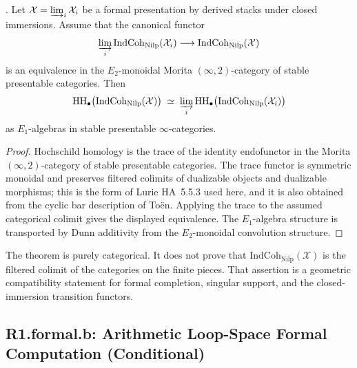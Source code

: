 \begin{theorem}
\label{v4-arith:bzn-sub:thm:R1-formal-a-closes}
\ClaimStatusProvedHere. Let \(\mathcal{X}=\varinjlim_{i}\mathcal{X}_{i}\)
be a formal presentation by derived stacks under closed immersions.
Assume that the canonical functor
\[
\varinjlim_i \mathrm{IndCoh}_{\mathrm{Nilp}}(\mathcal{X}_i)
\longrightarrow
\mathrm{IndCoh}_{\mathrm{Nilp}}(\mathcal{X})
\]
is an equivalence in the \(E_2\)-monoidal Morita
\((\infty,2)\)-category of stable presentable categories. Then
\begin{equation}
\mathrm{HH}_{\bullet}\bigl(\mathrm{IndCoh}_{\mathrm{Nilp}}(\mathcal{X})\bigr)\;\simeq\;\varinjlim_{i}\mathrm{HH}_{\bullet}\bigl(\mathrm{IndCoh}_{\mathrm{Nilp}}(\mathcal{X}_{i})\bigr)
\end{equation}
as \(E_{1}\)-algebras in stable presentable \(\infty\)-categories.
\end{theorem}

\begin{proof}
Hochschild homology is the trace of the identity endofunctor in the
Morita \((\infty,2)\)-category of stable presentable categories. The
trace functor is symmetric monoidal and preserves filtered colimits of
dualizable objects and dualizable morphisms; this is the form of
Lurie HA~5.5.3 used here, and it is also obtained from the cyclic bar
description of To\"en. Applying the trace to the assumed categorical
colimit gives the displayed equivalence. The \(E_1\)-algebra structure
is transported by Dunn additivity from the \(E_2\)-monoidal
convolution structure.
\end{proof}

\begin{remark}
\label{v4-arith:bzn-sub:rem:R1-formal-a-unconditional}
The theorem is purely categorical. It does not prove that
\(\mathrm{IndCoh}_{\mathrm{Nilp}}(\mathcal{X})\) is the filtered
colimit of the categories on the finite pieces. That assertion is a
geometric compatibility statement for formal completion, singular
support, and the closed-immersion transition functors.
\end{remark}

\subsection{R1.formal.b: Arithmetic Loop-Space Formal Computation (Conditional)}

